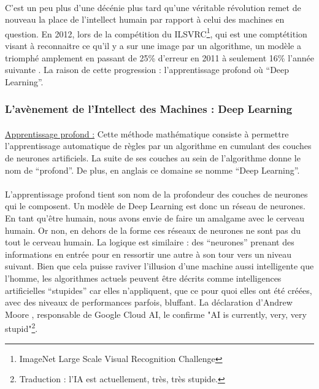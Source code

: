 \documentclass[10pt, french, a4paper]{report}
\begin{document}
\paragraph{}
C'est un peu plus d'une décénie plus tard qu'une véritable révolution remet de nouveau la place de l'intellect humain par rapport à celui des machines en question. En 2012, lors de la compétition du ILSVRC\footnote{ImageNet Large Scale Visual Recognition Challenge}, qui est une comptétition visant à reconnaitre ce qu'il y a sur une image par un algorithme, un modèle a triomphé amplement en passant de 25\% d'erreur en 2011 à seulement 16\% l'année suivante \citep{ILSVRC15}. La raison de cette progression : l'apprentissage profond où ``Deep Learning''.

\subsubsection{L'avènement de l'Intellect des Machines : Deep Learning}

\paragraph{}
\underline{Apprentissage profond :} Cette méthode mathématique consiste à permettre l'apprentissage automatique de règles par un algorithme en cumulant des couches de neurones artificiels. La suite de ses couches au sein de l'algorithme donne le nom de ``profond''. De plus, en anglais ce domaine se nomme ``Deep Learning''.

\paragraph{}
L'apprentissage profond tient son nom de la profondeur des couches de neurones qui le composent. Un modèle de Deep Learning est donc un réseau de neurones. En tant qu'être humain, nous avons envie de faire un amalgame avec le cerveau humain. Or non, en dehors de la forme ces réseaux de neurones ne sont pas du tout le cerveau humain. La logique est similaire : des ``neurones'' prenant des informations en entrée pour en ressortir une autre à son tour vers un niveau suivant. Bien que cela puisse raviver l’illusion d’une machine aussi intelligente que l’homme, les algorithmes actuels peuvent être décrits comme intelligences artificielles ``stupides'' car elles n’appliquent, que ce pour quoi elles ont été créées, avec des niveaux de performances parfois, bluffant. La déclaration d’Andrew Moore \citep{newsflash_ai_2018}, responsable de Google Cloud AI, le confirme "AI is currently, very, very stupid"\footnote{Traduction : l’IA est actuellement, très, très stupide.}.
\end{document}
